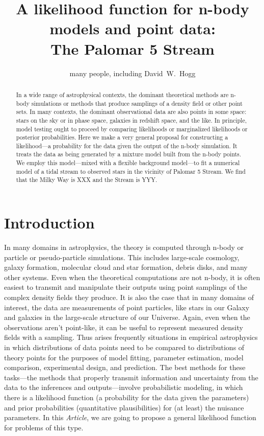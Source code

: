 \documentclass[12pt,pdftex,preprint]{aastex}
\newcommand{\documentname}{\textsl{Article}}
\begin{document}
\title{A likelihood function for n-body models and point data:\\
       The Palomar 5 Stream}
\author{many people, including David~W.~Hogg}

\begin{abstract}
In a wide range of astrophysical contexts, the dominant theoretical
methods are n-body simulations or methods that produce samplings of a
density field or other point sets.  In many contexts, the dominant
observational data are also points in some space: stars on the sky or
in phase space, galaxies in redshift space, and the like.  In
principle, model testing ought to proceed by comparing likelihoods or
marginalized likelihoods or posterior probabilities.  Here we make a
very general proposal for constructing a likelihood---a probability
for the data given the output of the n-body simulation.  It treats the
data as being generated by a mixture model built from the n-body
points.  We employ this model---mixed with a flexible background
model---to fit a numerical model of a tidal stream to observed stars
in the vicinity of Palomar 5 Stream.  We find that the Milky Way is
XXX and the Stream is YYY.
\end{abstract}

\section{Introduction}

In many domains in astrophysics, the theory is computed through n-body
or particle or pseudo-particle simulations.  This includes large-scale
cosmology, galaxy formation, molecular cloud and star formation,
debris disks, and many other systems.  Even when the theoretical
computations are not n-body, it is often easiest to transmit and
manipulate their outputs using point samplings of the complex density
fields they produce.  It is also the case that in many domains of
interest, the data are measurements of point particles, like stars in
our Galaxy and galaxies in the large-scale structure of our Universe.
Again, even when the observations aren't point-like, it can be useful
to represent measured density fields with a sampling.  Thus arises
frequently situations in empirical astrophysics in which distributions
of data points need to be compared to distributions of theory points
for the purposes of model fitting, parameter estimation, model
comparison, experimental design, and prediction.  The best methods for
these tasks---the methods that properly transmit information and
uncertainty from the data to the inferences and outputs---involve
probabilistic modeling, in which there is a likelihood function (a
probability for the data given the parameters) and prior probabilities
(quantitative plausibilities) for (at least) the nuisance parameters.
In this \documentname, we are going to propose a general likelihood
function for problems of this type.
\end{document}
